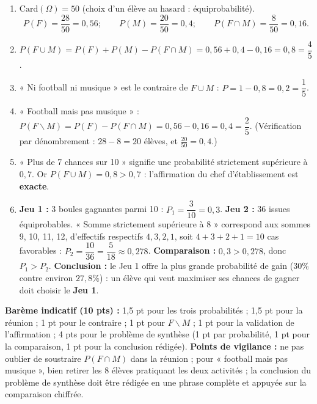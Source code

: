 \documentclass[11pt]{article}
\def\setminus{\mathbin{\backslash}}\let\smallsetminus\setminus
\begin{document}
\begin{corrige}
\begin{enumerate}
\item $\text{Card}(\Omega) = 50$ (choix d'un élève au hasard : équiprobabilité).
\[P(F) = \frac{28}{50} = 0{,}56 ; \qquad P(M) = \frac{20}{50} = 0{,}4 ; \qquad P(F \cap M) = \frac{8}{50} = 0{,}16.\]
\item $P(F \cup M) = P(F) + P(M) - P(F \cap M) = 0{,}56 + 0{,}4 - 0{,}16 = 0{,}8 = \dfrac{4}{5}$.
\item « Ni football ni musique » est le contraire de $F \cup M$ : $P = 1 - 0{,}8 = 0{,}2 = \dfrac{1}{5}$.
\item « Football mais pas musique » : $P(F \setminus M) = P(F) - P(F \cap M) = 0{,}56 - 0{,}16 = 0{,}4 = \dfrac{2}{5}$. (Vérification par dénombrement : $28 - 8 = 20$ élèves, et $\frac{20}{50} = 0{,}4$.)
\item « Plus de 7 chances sur 10 » signifie une probabilité strictement supérieure à $0{,}7$. Or $P(F \cup M) = 0{,}8 > 0{,}7$ : l'affirmation du chef d'établissement est \textbf{exacte}.
\item \textbf{Jeu 1 :} 3 boules gagnantes parmi 10 : $P_1 = \dfrac{3}{10} = 0{,}3$.
\textbf{Jeu 2 :} 36 issues équiprobables. « Somme strictement supérieure à 8 » correspond aux sommes 9, 10, 11, 12, d'effectifs respectifs $4, 3, 2, 1$, soit $4+3+2+1 = 10$ cas favorables : $P_2 = \dfrac{10}{36} = \dfrac{5}{18} \approx 0{,}278$.
\textbf{Comparaison :} $0{,}3 > 0{,}278$, donc $P_1 > P_2$.
\textbf{Conclusion :} le Jeu 1 offre la plus grande probabilité de gain ($30\%$ contre environ $27{,}8\%$) : un élève qui veut maximiser ses chances de gagner doit choisir le \textbf{Jeu 1}.
\end{enumerate}
\textbf{Barème indicatif (10 pts) :} 1,5 pt pour les trois probabilités ; 1,5 pt pour la réunion ; 1 pt pour le contraire ; 1 pt pour $F \setminus M$ ; 1 pt pour la validation de l'affirmation ; 4 pts pour le problème de synthèse (1 pt par probabilité, 1 pt pour la comparaison, 1 pt pour la conclusion rédigée).
\textbf{Points de vigilance :} ne pas oublier de soustraire $P(F \cap M)$ dans la réunion ; pour « football mais pas musique », bien retirer les 8 élèves pratiquant les deux activités ; la conclusion du problème de synthèse doit être rédigée en une phrase complète et appuyée sur la comparaison chiffrée.
\end{corrige}

\newpage
\end{document}

